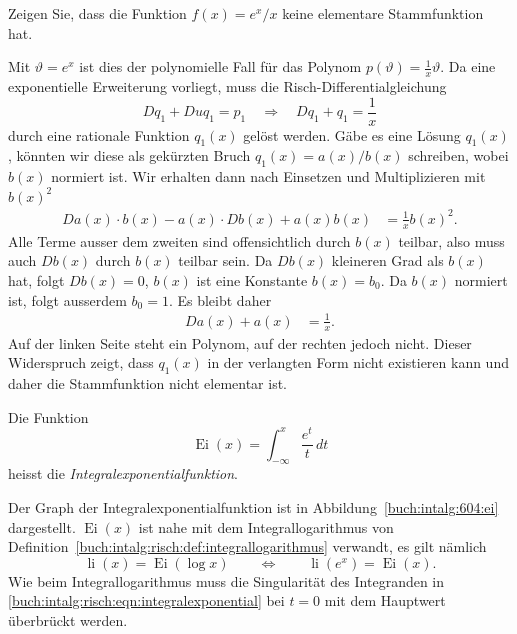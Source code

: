 Zeigen Sie, dass die Funktion $f(x)=e^x/x$ keine elementare Stammfunktion
hat.

\begin{loesung}
Mit $\vartheta = e^x$ ist dies der polynomielle Fall für das Polynom
$p(\vartheta)= \frac1{x}\vartheta$.
Da eine exponentielle Erweiterung vorliegt, muss die
Risch-Differentialgleichung
\[
Dq_1 + Du q_1 = p_1
\quad\Rightarrow\quad
Dq_1 + q_1 = \frac{1}{x}
\]
durch eine rationale Funktion $q_1(x)$ gelöst werden.
Gäbe es eine Lösung $q_1(x)$, könnten wir diese
als gekürzten Bruch $q_1(x)=a(x)/b(x)$ schreiben, wobei
$b(x)$ normiert ist.
Wir erhalten dann nach Einsetzen und Multiplizieren mit $b(x)^2$
\begin{align*}
Da(x)\cdot b(x) - a(x) \cdot Db(x) + a(x) b(x) &= \frac{1}{x}b(x)^2.
\end{align*}
Alle Terme ausser dem zweiten sind offensichtlich durch $b(x)$ teilbar,
also muss auch $Db(x)$ durch $b(x)$ teilbar sein.
Da $Db(x)$ kleineren Grad als $b(x)$ hat, folgt $Db(x)=0$, $b(x)$ ist eine
Konstante $b(x)=b_0$.
Da $b(x)$ normiert ist, folgt ausserdem $b_0=1$.
Es bleibt daher
\begin{align*}
Da(x) + a(x) &= \frac{1}{x}.
\end{align*}
Auf der linken Seite steht ein Polynom, auf der rechten jedoch nicht.
Dieser Widerspruch zeigt, dass $q_1(x)$ in der verlangten Form nicht
existieren kann und daher die Stammfunktion nicht elementar ist.
\end{loesung}

%

\begin{diskussion}
Die Funktion
\begin{equation}
\operatorname{Ei}(x)
=
\int_{-\infty}^x \frac{e^t}{t}\,dt
\label{buch:intalg:risch:eqn:integralexponential}
\end{equation}
heisst die \emph{Integralexponentialfunktion}.
%

Der Graph der Integralexponentialfunktion ist in
Abbildung~\ref{buch:intalg:604:ei} dargestellt.
$\operatorname{Ei}(x)$ ist nahe mit dem Integrallogarithmus
von Definition~\ref{buch:intalg:risch:def:integrallogarithmus}
verwandt, es gilt nämlich
\[
\operatorname{li}(x) = \operatorname{Ei}(\log x)
\qquad\Leftrightarrow\qquad
\operatorname{li}(e^x) = \operatorname{Ei}(x).
\]
Wie beim Integrallogarithmus muss die Singularität des Integranden in
\eqref{buch:intalg:risch:eqn:integralexponential}
bei $t=0$ mit dem Hauptwert überbrückt werden.
\end{diskussion}
